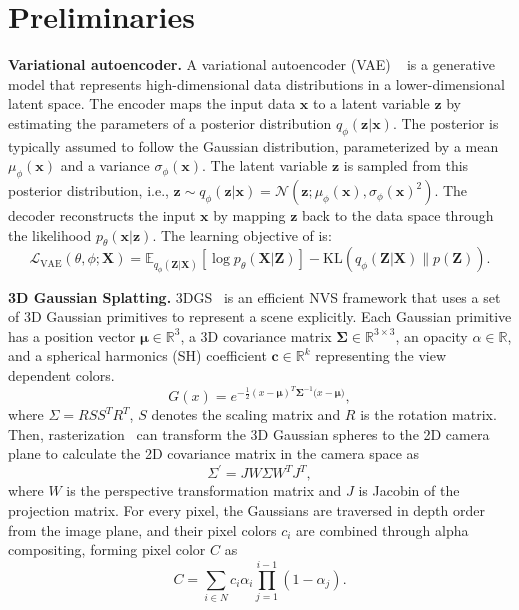 \section{Preliminaries}
\noindent \textbf{Variational autoencoder.}
A variational autoencoder (VAE) ~\citep{kingma2013auto} is a generative model that represents high-dimensional data distributions in a lower-dimensional latent space. 
The encoder maps the input data $\mathbf{x}$ to a latent variable $\mathbf{z}$ by estimating the parameters of a posterior distribution $q_{\phi}(\mathbf{z}|\mathbf{x})$. The posterior is typically assumed to follow the Gaussian distribution, parameterized by a mean $\mu_{\phi}(\mathbf{x})$ and a variance $\sigma_{\phi}(\mathbf{x})$. The latent variable $\mathbf{z}$ is sampled from this posterior distribution, i.e., $\mathbf{z} \sim q_{\phi}(\mathbf{z}|\mathbf{x}) = \mathcal{N}(\mathbf{z}; \mu_{\phi}(\mathbf{x}), \sigma_{\phi}(\mathbf{x})^2)$. The decoder reconstructs the input $\mathbf{x}$ by mapping $\mathbf{z}$ back to the data space through the likelihood $p_{\theta}(\mathbf{x}|\mathbf{z})$. The learning objective of is:
\begin{equation}
\mathcal{L}_{\text{VAE}}(\theta, \phi; \mathbf{X}) = \mathbb{E}_{q_{\phi}(\mathbf{Z}|\mathbf{X})}[\log p_{\theta}(\mathbf{X}|\mathbf{Z})] - \text{KL}(q_{\phi}(\mathbf{Z}|\mathbf{X}) \| p(\mathbf{Z})).
\label{eq:vae}
\end{equation}



\noindent \textbf{3D Gaussian Splatting.}
3DGS~\citep{kerbl3Dgaussians} is an efficient NVS framework that uses a set of 3D Gaussian primitives to represent a scene explicitly. Each Gaussian primitive has a position vector $\boldsymbol{\mu} \in \mathbb{R}^3$, a 3D covariance matrix $\boldsymbol{\Sigma} \in \mathbb{R}^{3\times 3}$, an opacity $\alpha \in \mathbb{R}$, and a spherical harmonics (SH) coefficient  $\boldsymbol{c} \in \mathbb{R}^k$ \citep{ramamoorthi2001efficient} representing the view dependent colors.
\begin{equation}
G(x)=e^{-\frac{1}{2}(x-\boldsymbol{\mu})^T \boldsymbol{\Sigma}^{-1}(x-\boldsymbol{\mu)}},
\end{equation}
where ${\Sigma}={R}{S}{S}^T{R}^T$, ${S}$ denotes the scaling matrix and ${R}$ is the rotation matrix. Then, rasterization~\citep{zwicker2001surface} can transform the 3D Gaussian spheres to the 2D camera plane to calculate the 2D covariance matrix in the camera space as 
\begin{equation}
{\Sigma}^{'} = {J}{W}{\Sigma} {W}^T{J}^T,
\end{equation}
where ${W}$ is the perspective transformation matrix and ${J}$ is Jacobin of the projection matrix.
For every pixel, the Gaussians are traversed in depth order from the image plane, and their pixel colors $c_i$  are combined through alpha compositing, forming pixel color ${C}$ as
\begin{equation}
{C}=\sum_{i \in N} c_i \alpha_i \prod_{j=1}^{i-1}\left(1-\alpha_j\right).
\end{equation}

